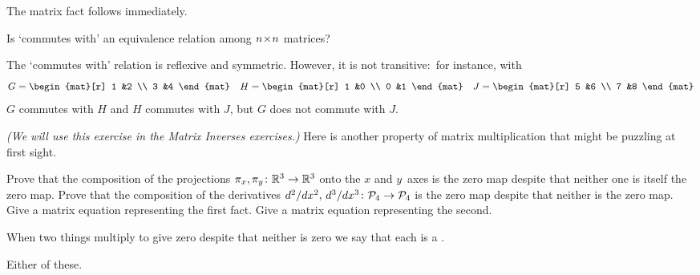 \begin{exercises}
\begin{answer}
\begin{exparts}
          The matrix fact follows immediately.  
     \end{exparts}
    \end{answer}
  \item 
    Is `commutes with' an equivalence relation among $n \! \times \! n$
    matrices?
    \begin{answer}
      The `commutes with' relation is reflexive and symmetric.
      However, it is not transitive:~for instance, with
      \begin{equation*}
        G=\begin{mat}[r]
          1  &2  \\
          3  &4
        \end{mat}
        \quad
        H=\begin{mat}[r]
          1  &0  \\
          0  &1
        \end{mat}
        \quad
        J=\begin{mat}[r]
          5  &6  \\
          7  &8
        \end{mat}
      \end{equation*}
      $G$ commutes with $H$ and $H$ commutes with $J$, but $G$ does not
      commute with $J$.    
    \end{answer}
  \recommended \item \label{exer:ZeroDivisor}
    \textit{(We will use this exercise in the Matrix Inverses exercises.)}
    Here is another property of matrix multiplication that might be
    puzzling at first sight.
    \begin{exparts}
      \partsitem Prove that the composition of the projections
        \( \mbox{$\pi_x,\pi_y\colon \mathbb{R}^3\to \mathbb{R}^3$} \)
        onto the \( x \) and \( y \)~axes
        is the zero map despite that neither one is itself the zero map.
      \partsitem Prove that the composition of the derivatives
        \( \mbox{$d^2/dx^2,\,d^3/dx^3\colon \mathcal{P}_4\to \mathcal{P}_4$} \)
        is the zero map despite that neither is the zero map.
      \partsitem Give a matrix equation representing the first fact.
      \partsitem Give a matrix equation representing the second.
    \end{exparts}
    When two things multiply to give zero despite that neither is zero
    we say that each is
    a .%
    \begin{answer}
      \begin{exparts}
        \partsitem Either of these.

\end{exparts}
\end{answer}
\end{exercises}

